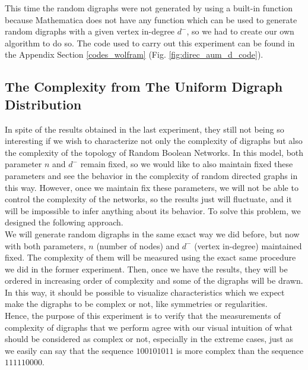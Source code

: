 This time the random digraphs were not generated by using a built-in function because Mathematica does not have any function which can be used to generate random digraphs with a given vertex in-degree $ d^{-}$, so we had to create our own algorithm to do so. The code used to carry out this experiment can be found in the Appendix Section \ref{codes_wolfram} (Fig. \ref{fig:direc_aum_d_code}).

\subsection{The Complexity from The Uniform Digraph Distribution}
\label{uni_di_dist_section}
In spite of the results obtained in the last experiment, they still not being so interesting if we wish to characterize not only the complexity of digraphs but also the complexity of the topology of Random Boolean Networks. In this model, both parameter $n$ and $ d^{-}$ remain fixed, so we would like to also maintain fixed these parameters and see the behavior in the complexity of random directed graphs in this way. However, once we maintain fix these parameters, we will not be able to control the complexity of the networks, so the results just will fluctuate, and it will be impossible to infer anything about its behavior. To solve this problem, we designed the following approach.\\

We will generate random digraphs in the same exact way we did before, but now with both parameters, $n$ (number of nodes) and $ d^{-}$ (vertex in-degree) maintained fixed. The complexity of them will be measured using the exact same procedure we did in the former experiment. Then, once we have the results, they will be ordered in increasing order of complexity and some of the digraphs will be drawn. In this way, it should be possible to visualize characteristics which we expect make the digraphs to be complex or not, like symmetries or regularities.\\

Hence, the purpose of this experiment is to verify that the measurements of complexity of digraphs that we perform agree with our visual intuition of what should be considered as complex or not, especially in the extreme cases, just as we easily can say that the sequence $100101011$ is more complex than the sequence $111110000$.\\

